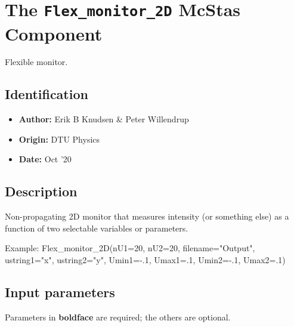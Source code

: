 \section{The \texttt{Flex\_monitor\_2D} McStas Component}
Flexible monitor.

\subsection*{Identification}
\begin{itemize}
  \item \textbf{Author:} Erik B Knudsen \& Peter Willendrup
  \item \textbf{Origin:} DTU Physics
  \item \textbf{Date:} Oct '20
\end{itemize}

\subsection*{Description}
Non-propagating 2D monitor that measures intensity (or something else) as a function of two selectable variables or parameters.

Example: Flex\_monitor\_2D(nU1=20, nU2=20, filename="Output", ustring1="x", ustring2="y", Umin1=-.1, Umax1=.1, Umin2=-.1, Umax2=.1)

\subsection*{Input parameters}
Parameters in \textbf{boldface} are required; the others are optional.

